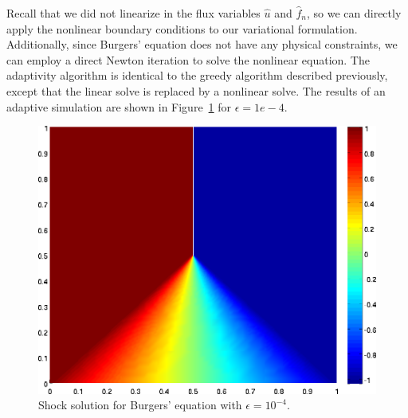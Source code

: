 Recall that we did not linearize in the flux variables $\widehat{u}$ and $\widehat{f}_n$, so we can directly apply the nonlinear boundary conditions to our variational formulation.  Additionally, since Burgers' equation does not have any physical constraints, we can employ a direct Newton iteration to solve the nonlinear equation.  The adaptivity algorithm is identical to the greedy algorithm described previously, except that the linear solve is replaced by a nonlinear solve.  The results of an adaptive simulation are shown in Figure~\ref{fig:BurgersShock} for $\epsilon = 1e-4$.  

\begin{figure}[!h]
\centering
\includegraphics[scale=.5]{figs/burgers1e4.png}
\caption{Shock solution for Burgers' equation with $\epsilon = 10^{-4}$.} 
\label{fig:BurgersShock}
\end{figure}

